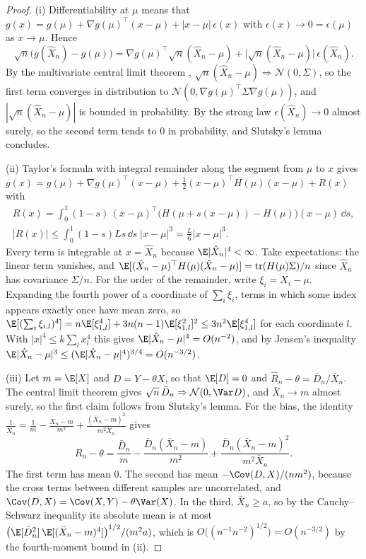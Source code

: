 \begin{proof}
(i) Differentiability at $\mu$ means that
$g(x)=g(\mu)+\nabla g(\mu)^\top(x-\mu)+|x-\mu|\,\epsilon(x)$ with $\epsilon(x)\to0=\epsilon(\mu)$
as $x\to\mu$. Hence
\[
  \sqrt n\big(g(\hat X_n)-g(\mu)\big)=\nabla g(\mu)^\top\sqrt n(\hat X_n-\mu)
  +\big|\sqrt n(\hat X_n-\mu)\big|\,\epsilon(\hat X_n).
\]
By the multivariate central limit theorem \citep[Section~3.10]{durrett},
$\sqrt n(\hat X_n-\mu)\Rightarrow\mathcal N(0,\Sigma)$, so the first term converges in
distribution to $\mathcal N(0,\nabla g(\mu)^\top\Sigma\nabla g(\mu))$, and
$|\sqrt n(\hat X_n-\mu)|$ is bounded in probability. By the strong law
$\epsilon(\hat X_n)\to0$ almost surely, so the second term tends to $0$ in probability, and
Slutsky's lemma concludes.

(ii) Taylor's formula with integral remainder along the segment from $\mu$ to $x$ gives
$g(x)=g(\mu)+\nabla g(\mu)^\top(x-\mu)+\frac12(x-\mu)^\top H(\mu)(x-\mu)+R(x)$ with
\begin{gather*}
  R(x)=\int_0^1(1-s)\,(x-\mu)^\top\big(H(\mu+s(x-\mu))-H(\mu)\big)(x-\mu)\,\dd s,\\
  |R(x)|\le\int_0^1(1-s)Ls\,\dd s\;|x-\mu|^3=\frac L6|x-\mu|^3 .
\end{gather*}
Every term is integrable at $x=\hat X_n$ because $\E|\hat X_n|^4<\infty$. Take expectations:
the linear term vanishes, and $\E[(\hat X_n-\mu)^\top H(\mu)(\hat X_n-\mu)]
=\operatorname{tr}(H(\mu)\Sigma)/n$ since $\hat X_n$ has covariance $\Sigma/n$. For the
order of the remainder, write $\xi_i=X_i-\mu$. Expanding the fourth power of a coordinate
of $\sum_i\xi_i$, terms in which some index appears exactly once have mean zero, so
$\E[(\sum_i\xi_{i,l})^4]=n\E[\xi_{1,l}^4]+3n(n-1)\E[\xi_{1,l}^2]^2\le3n^2\E[\xi_{1,l}^4]$ for
each coordinate $l$. With $|x|^4\le k\sum_lx_l^4$ this gives $\E|\hat X_n-\mu|^4=O(n^{-2})$,
and by Jensen's inequality $\E|\hat X_n-\mu|^3\le(\E|\hat X_n-\mu|^4)^{3/4}=O(n^{-3/2})$.

(iii) Let $m=\E[X]$ and $D=Y-\theta X$, so that $\E[D]=0$ and
$\hat R_n-\theta=\bar D_n/\bar X_n$. The central limit theorem gives
$\sqrt n\,\bar D_n\Rightarrow\mathcal N(0,\Var D)$, and $\bar X_n\to m$ almost surely, so the
first claim follows from Slutsky's lemma. For the bias, the identity
$\frac1{\bar X_n}=\frac1m-\frac{\bar X_n-m}{m^2}+\frac{(\bar X_n-m)^2}{m^2\bar X_n}$ gives
\[
  \hat R_n-\theta=\frac{\bar D_n}{m}-\frac{\bar D_n(\bar X_n-m)}{m^2}
  +\frac{\bar D_n(\bar X_n-m)^2}{m^2\bar X_n}.
\]
The first term has mean $0$. The second has mean $-\Cov(D,X)/(nm^2)$, because the cross
terms between different samples are uncorrelated, and $\Cov(D,X)=\Cov(X,Y)-\theta\Var(X)$.
In the third, $\bar X_n\ge a$, so by the Cauchy--Schwarz inequality its absolute mean is at
most $\big(\E[\bar D_n^2]\,\E[(\bar X_n-m)^4]\big)^{1/2}/(m^2a)$, which is
$O\big((n^{-1}n^{-2})^{1/2}\big)=O(n^{-3/2})$ by the fourth-moment bound in (ii).
\end{proof}

